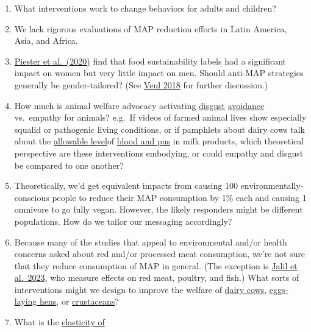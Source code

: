 \documentclass[
  letterpaper,
  DIV=11,
  numbers=noendperiod]{scrartcl}
\providecommand{\tightlist}{%
  \setlength{\itemsep}{0pt}\setlength{\parskip}{0pt}}\usepackage{longtable,booktabs,array}
\begin{document}
\begin{enumerate}
\def\labelenumi{\arabic{enumi}.}
\tightlist
\item
  What interventions work to change behaviors for adults and children?
\item
  We lack rigorous evaluations of MAP reduction efforts in Latin
  America, Asia, and Africa.
\item
  \href{https://linkinghub.elsevier.com/retrieve/pii/S0195666319312115}{Piester
  et al.~(2020)} find that food sustainability labels had a significant
  impact on women but very little impact on men. Should anti-MAP
  strategies generally be gender-tailored? (See
  \href{https://theses.ubn.ru.nl/items/fcd6b5e7-7981-4086-aca0-4da7d28d42b2}{Veul
  2018} for further discussion.)
\item
  How much is animal welfare advocacy activating
  \href{https://www.ncbi.nlm.nih.gov/pmc/articles/PMC3189352/}{disgust}
  \href{https://www.nature.com/articles/s41598-021-91712-3}{avoidance}
  vs.~empathy for animals? e.g.~If videos of farmed animal lives show
  especially squalid or pathogenic living conditions, or if pamphlets
  about dairy cows talk about the
  \href{https://genv.org/pus-in-milk/}{allowable level}of
  \href{https://www.ncbi.nlm.nih.gov/pmc/articles/PMC7649072/}{blood and
  pus} in milk products, which theoretical perspective are these
  interventions embodying, or could empathy and disgust be compared to
  one another?
\item
  Theoretically, we'd get equivalent impacts from causing 100
  environmentally-conscious people to reduce their MAP consumption by
  1\% each and causing 1 omnivore to go fully vegan. However, the likely
  responders might be different populations. How do we tailor our
  messaging accordingly?
\item
  Because many of the studies that appeal to environmental and/or health
  concerns asked about red and/or processed meat consumption, we're not
  sure that they reduce consumption of MAP in general. (The exception is
  \href{https://doi.org/10.1038/s43016-023-00712-1}{Jalil et al.~2023},
  who measure effects on red meat, poultry, and fish.) What sorts of
  interventions might we design to improve the welfare of
  \href{https://www.mspca.org/animal_protection/farm-animal-welfare-cows/}{dairy
  cows}, \href{https://openwingalliance.org/}{eggs-laying hens}, or
  \href{https://forum.effectivealtruism.org/topics/shrimp-welfare-project}{crustaceans}?
\item
  What is the
  \href{https://www.youtube.com/watch?v=J82_xd5XxXg}{elasticity of
}
\end{enumerate}
\end{document}
